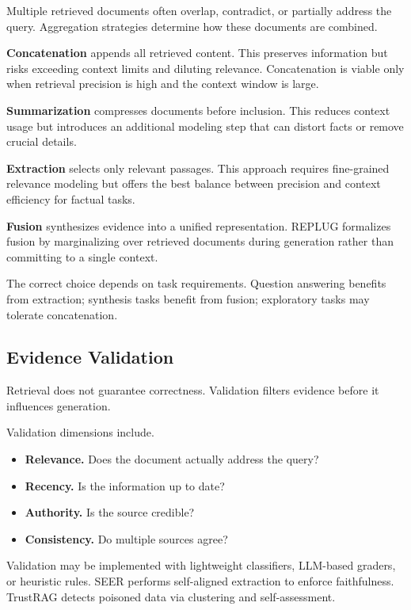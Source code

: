 Multiple retrieved documents often overlap, contradict, or partially address the query. Aggregation strategies determine how these documents are combined.

\textbf{Concatenation} appends all retrieved content. This preserves information but risks exceeding context limits and diluting relevance. Concatenation is viable only when retrieval precision is high and the context window is large.

\textbf{Summarization} compresses documents before inclusion. This reduces context usage but introduces an additional modeling step that can distort facts or remove crucial details.

\textbf{Extraction} selects only relevant passages. This approach requires fine-grained relevance modeling but offers the best balance between precision and context efficiency for factual tasks.

\textbf{Fusion} synthesizes evidence into a unified representation. REPLUG \cite{replug} formalizes fusion by marginalizing over retrieved documents during generation rather than committing to a single context.

The correct choice depends on task requirements. Question answering benefits from extraction; synthesis tasks benefit from fusion; exploratory tasks may tolerate concatenation.

\subsection{Evidence Validation}

Retrieval does not guarantee correctness. Validation filters evidence before it influences generation.

Validation dimensions include.
\begin{itemize}
\item \textbf{Relevance.} Does the document actually address the query?
\item \textbf{Recency.} Is the information up to date?
\item \textbf{Authority.} Is the source credible?
\item \textbf{Consistency.} Do multiple sources agree?
\end{itemize}

Validation may be implemented with lightweight classifiers, LLM-based graders, or heuristic rules. SEER \cite{seer2024} performs self-aligned extraction to enforce faithfulness. TrustRAG \cite{trustrag} detects poisoned data via clustering and self-assessment.

